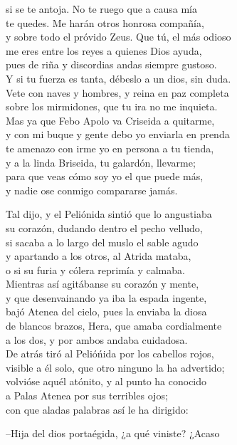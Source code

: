 si se te antoja. No te ruego que a causa mía\\
te quedes. Me harán otros honrosa compañía,\\
y sobre todo el próvido Zeus. Que tú, el más odioso\\
me eres entre los reyes a quienes Dios ayuda,\\
pues de riña y discordias andas siempre gustoso.\\
Y si tu fuerza es tanta, débeslo a un dios, sin duda.\\
Vete con naves y hombres, y reina en paz completa\\
sobre los mirmidones, que tu ira no me inquieta.\\
Mas ya que Febo Apolo va Criseida a quitarme,\\
y con mi buque y gente debo yo enviarla en prenda\\
te amenazo con irme yo en persona a tu tienda,\\
y a la linda Briseida, tu galardón, llevarme;\\
para que veas cómo soy yo el que puede más,\\
y nadie ose conmigo compararse jamás.\par
Tal dijo, y el Peliónida sintió que lo angustiaba\\
su corazón, dudando dentro el pecho velludo,\\
si sacaba a lo largo del muslo el sable agudo\\
y apartando a los otros, al Atrida mataba,\\
o si su furia y cólera reprimía y calmaba.\\
Mientras así agitábanse su corazón y mente,\\
y que desenvainando ya iba la espada ingente,\\
bajó Atenea del cielo, pues la enviaba la diosa\\
de blancos brazos, Hera, que amaba cordialmente\\
a los dos, y por ambos andaba cuidadosa.\\
De atrás tiró al Pelióńida por los cabellos rojos,\\
visible a él solo, que otro ninguno la ha advertido;\\
volvióse aquél atónito, y al punto ha conocido\\
a Palas Atenea por sus terribles ojos;\\
con que aladas palabras así le ha dirigido:\par
--Hija del dios portaégida, ¿a qué viniste? ¿Acaso\\
